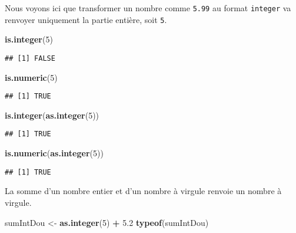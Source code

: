 \documentclass[]{book}
\newenvironment{Shaded}{\begin{snugshade}}{\end{snugshade}}
\newcommand{\KeywordTok}[1]{\textcolor[rgb]{0.13,0.29,0.53}{\textbf{#1}}}
\newcommand{\DecValTok}[1]{\textcolor[rgb]{0.00,0.00,0.81}{#1}}
\newcommand{\FloatTok}[1]{\textcolor[rgb]{0.00,0.00,0.81}{#1}}
\newcommand{\StringTok}[1]{\textcolor[rgb]{0.31,0.60,0.02}{#1}}
\newcommand{\OperatorTok}[1]{\textcolor[rgb]{0.81,0.36,0.00}{\textbf{#1}}}
\newcommand{\NormalTok}[1]{#1}
\theoremstyle{definition}
\theoremstyle{definition}
\theoremstyle{definition}
\theoremstyle{remark}
\begin{document}
Nous voyons ici que transformer un nombre comme \texttt{5.99} au format
\texttt{integer} va renvoyer uniquement la partie entière, soit
\texttt{5}.

\begin{Shaded}
\begin{Highlighting}[]
\KeywordTok{is.integer}\NormalTok{(}\DecValTok{5}\NormalTok{)}
\end{Highlighting}
\end{Shaded}

\begin{verbatim}
## [1] FALSE
\end{verbatim}

\begin{Shaded}
\begin{Highlighting}[]
\KeywordTok{is.numeric}\NormalTok{(}\DecValTok{5}\NormalTok{)}
\end{Highlighting}
\end{Shaded}

\begin{verbatim}
## [1] TRUE
\end{verbatim}

\begin{Shaded}
\begin{Highlighting}[]
\KeywordTok{is.integer}\NormalTok{(}\KeywordTok{as.integer}\NormalTok{(}\DecValTok{5}\NormalTok{))}
\end{Highlighting}
\end{Shaded}

\begin{verbatim}
## [1] TRUE
\end{verbatim}

\begin{Shaded}
\begin{Highlighting}[]
\KeywordTok{is.numeric}\NormalTok{(}\KeywordTok{as.integer}\NormalTok{(}\DecValTok{5}\NormalTok{))}
\end{Highlighting}
\end{Shaded}

\begin{verbatim}
## [1] TRUE
\end{verbatim}

La somme d'un nombre entier et d'un nombre à virgule renvoie un nombre à
virgule.

\begin{Shaded}
\begin{Highlighting}[]
\NormalTok{sumIntDou <-}\StringTok{ }\KeywordTok{as.integer}\NormalTok{(}\DecValTok{5}\NormalTok{) }\OperatorTok{+}\StringTok{ }\FloatTok{5.2}
\KeywordTok{typeof}\NormalTok{(sumIntDou)}
\end{Highlighting}
\end{Shaded}
\end{document}
